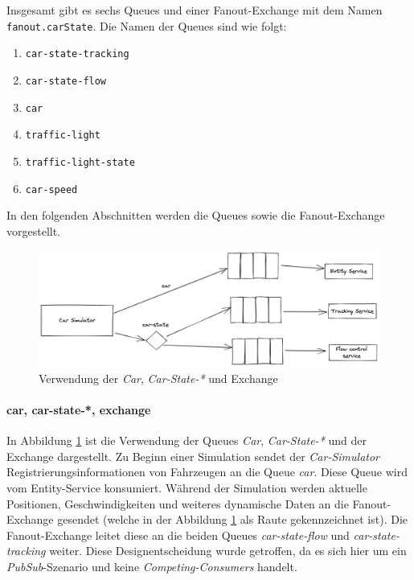 Insgesamt gibt es sechs Queues und einer Fanout-Exchange mit dem Namen \verb|fanout.carState|.
Die Namen der Queues sind wie folgt:
\begin{enumerate}
	\item \verb|car-state-tracking| 
	\item \verb|car-state-flow| 
	\item \verb|car| 
	\item \verb|traffic-light| 
	\item \verb|traffic-light-state| 
	\item \verb|car-speed| 
\end{enumerate}

In den folgenden Abschnitten werden die Queues sowie die Fanout-Ex\-change vorgestellt.

\begin{figure}[h]
	\centering
	\includegraphics[width=1\textwidth]{./figures/car_simulator_mom.png}
	\caption{Verwendung der \textit{Car}, \textit{Car-State-*} und Exchange}
	\label{fig:car_simulator_mom}
\end{figure}

\paragraph{car, car-state-*, exchange}

In Abbildung \ref{fig:car_simulator_mom} ist die Verwendung der Queues \textit{Car}, \textit{Car-State-*} und der Exchange dargestellt.
Zu Beginn einer Simulation sendet der \textit{Car-Simulator} Registrierungsinformationen von Fahrzeugen an die Queue \textit{car}.
Diese Queue wird vom Entity-Service konsumiert.
Während der Simulation werden aktuelle Positionen, Geschwindigkeiten und weiteres dynamische Daten an die Fanout-Exchange gesendet (welche in der Abbildung \ref{fig:car_simulator_mom} als Raute gekennzeichnet ist).
Die Fanout-Exchange leitet diese an die beiden Queues \textit{car-state-flow} und \textit{car-state-tracking} weiter.
Diese Designentscheidung wurde getroffen, da es sich hier um ein \textit{PubSub}-Szenario und keine \textit{Competing-Consumers} handelt.

